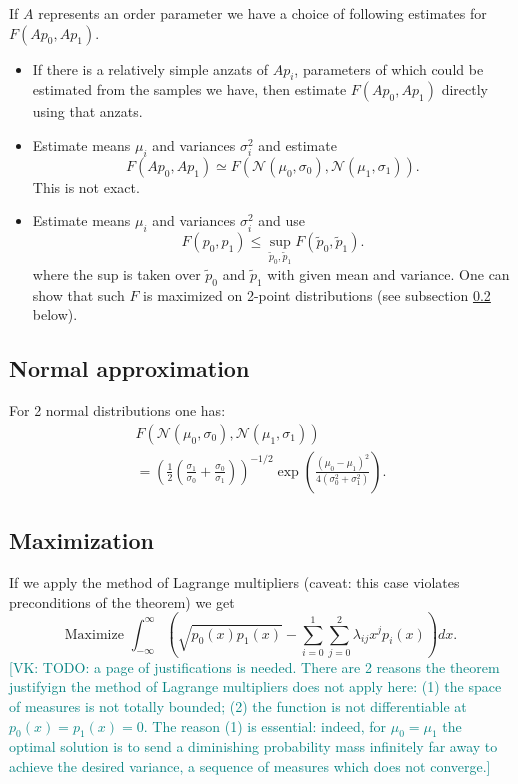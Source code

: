 \documentclass[american,aps,pra,reprint,floatfix,nofootinbib,superscriptaddress]{revtex4-2}
\newcommand{\VK}[1]{\textcolor{teal}{[VK: #1]}}
\begin{document}
If $A$ represents an order parameter we have a choice of
following estimates for $F(Ap_0, Ap_1)$.
\begin{itemize}
  \item If there is a relatively simple anzats of $Ap_i$,
    parameters of which could be estimated from the samples we have,
    then estimate $F(Ap_0, Ap_1)$ directly using that anzats.
  \item Estimate means $\mu_i$ and variances $\sigma_i^2$ and estimate
    \begin{equation}
      F(Ap_0, Ap_1) \simeq 
      F(\mathcal{N}(\mu_0, \sigma_0), \mathcal{N}(\mu_1, \sigma_1)).
    \end{equation}
    This is not exact.
  \item Estimate means $\mu_i$ and variances $\sigma_i^2$ and use
    \begin{equation}
      F(p_0, p_1) \leq \sup_{\widetilde p_0, \widetilde p_1}
        F(\widetilde p_0, \widetilde p_1).
    \end{equation}
    where the sup is taken over $\widetilde p_0$ and $\widetilde p_1$ with given
    mean and variance.
    One can show that such $F$ is maximized on 2-point distributions
    (see subsection \ref{ss:maxF} below).
\end{itemize}

\subsection{Normal approximation}
For 2 normal distributions one has:
\begin{multline}
  F(\mathcal{N}(\mu_0, \sigma_0), \mathcal{N}(\mu_1, \sigma_1)) \\
  = \left(\frac12\left(
      \frac{\sigma_1}{\sigma_0} + \frac{\sigma_0}{\sigma_1}\right)\right)^{-1/2}
    \exp\left(\frac{(\mu_0-\mu_1)^2}{4(\sigma_0^2 + \sigma_1^2)}\right).
\end{multline}

\subsection{Maximization}
\label{ss:maxF}
If we apply the method of Lagrange multipliers (caveat: this case violates preconditions of the theorem)
we get
\begin{equation}
  \text{Maximize } \int_{-\infty}^{\infty} \left(\sqrt{p_0(x) p_1(x)} - \sum_{i=0}^1\sum_{j=0}^2 \lambda_{ij} x^j p_i(x)\right)dx.
\end{equation}
\VK{TODO: a page of justifications is needed. There are 2 reasons
  the theorem justifyign the method of Lagrange multipliers
  does not apply here: (1) the space of measures is not totally bounded;
  (2) the function is not differentiable at $p_0(x) = p_1(x) = 0$.
  The reason (1) is essential: indeed, for $\mu_0=\mu_1$ the optimal
  solution is to send a diminishing probability mass infinitely far away
  to achieve the desired variance, a sequence of measures which
  does not converge.}
\end{document}
